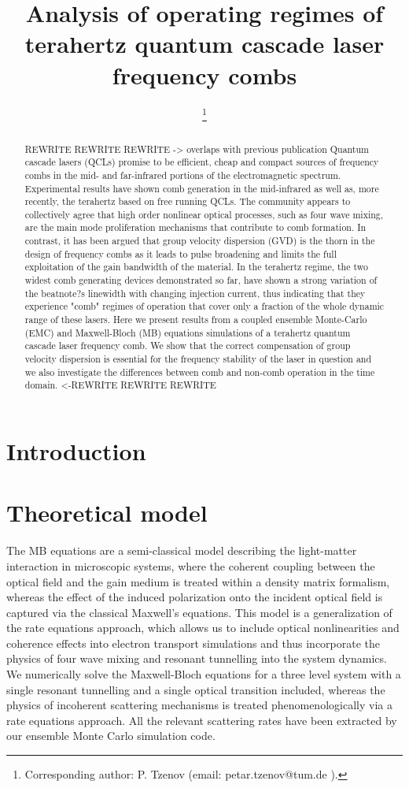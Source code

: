 \documentclass[journal]{IEEEtran}
\title{Analysis of operating regimes of terahertz quantum cascade laser frequency combs}
\author{\IEEEauthorblockN{Petar Tzenov\IEEEauthorrefmark{1},
		David Burghoff\IEEEauthorrefmark{2},
		Qing Hu\IEEEauthorrefmark{2}, 
		Christian Jirauschek\IEEEauthorrefmark{1}}
	
	\IEEEauthorblockA{\IEEEauthorrefmark{1}Institute for Nanoelectronics, Technical University of Munich, D-80333 Munich, Germany}
	
	\IEEEauthorblockA{\IEEEauthorrefmark{2}Department of Electrical Engineering and Computer Science, Research Laboratory of Electronics, Massachusetts Institute of Technology, Cambridge, Massachusetts 02139, USA}
	\thanks{Corresponding author: P. Tzenov (email: petar.tzenov@tum.de ).}}
\begin{document}
 
\maketitle

	

\begin{abstract}
REWRITE REWRITE REWRITE -> overlaps with previous publication
Quantum cascade lasers (QCLs) promise to be efficient, cheap and compact sources of frequency combs in the mid- and far-infrared portions of the electromagnetic spectrum. Experimental results have shown comb generation in the mid-infrared as well as, more recently, the terahertz based on free running QCLs. The community appears to collectively agree that high order nonlinear optical processes, such as four wave mixing, are the main mode proliferation mechanisms that contribute to comb formation. In contrast, it has been argued that group velocity dispersion (GVD) is the thorn in the design of frequency combs as it leads to pulse broadening and limits the full exploitation of the gain bandwidth of the material. In the terahertz regime, the two widest comb generating devices demonstrated so far, have shown a strong variation of the beatnote?s linewidth with changing injection current, thus indicating that they experience "comb" regimes of operation that cover only a fraction of the whole dynamic range of these lasers. Here we present results from a coupled ensemble Monte-Carlo (EMC) and Maxwell-Bloch (MB) equations simulations of a terahertz quantum cascade laser frequency comb. We show that the correct compensation of group velocity dispersion is essential for the frequency stability of the laser in question and we also investigate the differences between comb and non-comb operation in the time domain. <-REWRITE REWRITE REWRITE 
\end{abstract}

\section{Introduction}

\section{Theoretical model}
The MB equations are a semi-classical model describing the light-matter interaction in microscopic systems, where the coherent coupling between the optical field and the gain medium is treated within a density matrix formalism, whereas the effect of the induced polarization onto the incident optical field is captured via the classical Maxwell's equations. This model is a generalization of the rate equations approach, which allows us to include optical nonlinearities and coherence effects into electron transport simulations and thus incorporate the physics of four wave mixing and resonant tunnelling into the system dynamics. We numerically solve the Maxwell-Bloch equations for a three level system with a single resonant tunnelling and a single optical transition included, whereas the physics of incoherent scattering mechanisms is treated phenomenologically via a rate equations approach. All the relevant scattering rates have been extracted by our ensemble Monte Carlo simulation code.
\end{document}
